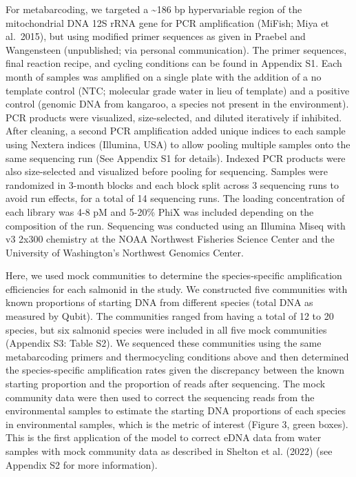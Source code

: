 \documentclass[
]{article}
\begin{document}
For metabarcoding, we targeted a \textasciitilde186 bp hypervariable
region of the mitochondrial DNA 12S rRNA gene for PCR amplification
(MiFish; Miya et al.~2015), but using modified primer sequences as given
in Praebel and Wangensteen (unpublished; via personal communication).
The primer sequences, final reaction recipe, and cycling conditions can
be found in Appendix S1. Each month of samples was amplified on a single
plate with the addition of a no template control (NTC; molecular grade
water in lieu of template) and a positive control (genomic DNA from
kangaroo, a species not present in the environment). PCR products were
visualized, size-selected, and diluted iteratively if inhibited. After
cleaning, a second PCR amplification added unique indices to each sample
using Nextera indices (Illumina, USA) to allow pooling multiple samples
onto the same sequencing run (See Appendix S1 for details). Indexed PCR
products were also size-selected and visualized before pooling for
sequencing. Samples were randomized in 3-month blocks and each block
split across 3 sequencing runs to avoid run effects, for a total of 14
sequencing runs. The loading concentration of each library was 4-8 pM
and 5-20\% PhiX was included depending on the composition of the run.
Sequencing was conducted using an Illumina Miseq with v3 2x300 chemistry
at the NOAA Northwest Fisheries Science Center and the University of
Washington's Northwest Genomics Center.

Here, we used mock communities to determine the species-specific
amplification efficiencies for each salmonid in the study. We
constructed five communities with known proportions of starting DNA from
different species (total DNA as measured by Qubit). The communities
ranged from having a total of 12 to 20 species, but six salmonid species
were included in all five mock communities (Appendix S3: Table S2). We
sequenced these communities using the same metabarcoding primers and
thermocycling conditions above and then determined the species-specific
amplification rates given the discrepancy between the known starting
proportion and the proportion of reads after sequencing. The mock
community data were then used to correct the sequencing reads from the
environmental samples to estimate the starting DNA proportions of each
species in environmental samples, which is the metric of interest
(Figure 3, green boxes). This is the first application of the model to
correct eDNA data from water samples with mock community data as
described in Shelton et al. (2022) (see Appendix S2 for more
information).
\end{document}
